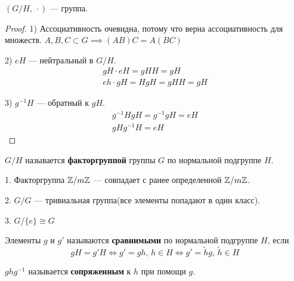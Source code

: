 \documentclass[../main.tex]{subfiles}
\begin{document}
\begin{theorem-non}
    $(G / H, \, \cdot)$ --- группа.
\end{theorem-non}
\begin{proof}
    1) Ассоциативность очевидна, потому что верна ассоциативность для множеств. $A, B, C \subset G \implies (AB)C = A(BC)$

    2) $eH$ --- нейтральный в $G / H$.
    \begin{equation*}
        \begin{gathered}
            gH \cdot eH = gHH = gH\\
            eh \cdot gH = HgH = gHH = gH
        \end{gathered}
    \end{equation*}

    3) $g^{-1}H$ --- обратный к $gH$.
    \begin{equation*}
        \begin{gathered}
            g^{-1}HgH = g^{-1}gH = eH \\
            gHg^{-1}H = eH
        \end{gathered}
    \end{equation*}
\end{proof}
\begin{definition}
    $G / H$ называется \textbf{факторгруппой} группы $G$ по нормальной подгруппе $H$.
\end{definition}

\begin{theorem-non}
    1. Факторгруппа $\mathbb{Z}/m\mathbb{Z}$ --- совпадает с ранее определенной $\mathbb{Z}/m\mathbb{Z}$.

    2. $G / G$ --- тривиальная группа(все элементы попадают в один класс).

    3. $G / \{e\} \cong G$
\end{theorem-non}

\begin{definition}
    Элементы $g$ и $g'$ называются \textbf{сравнимыми} по нормальной подгруппе $H$, если
    \begin{equation*}
      gH = g'H \iff g' = gh, \, h \in H \iff g' = \tilde{h}g, \, \tilde{h} \in H
    \end{equation*}
\end{definition}

\begin{definition}
    $ghg^{-1}$ называется \textbf{сопряженным} к $h$ при помощи $g$.
\end{definition}
\end{document}
